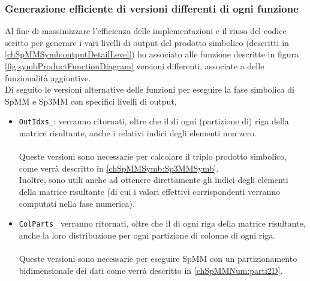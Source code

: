 \subsubsection{Generazione efficiente di versioni differenti di ogni funzione}
%
Al fine di massimizzare l'efficienza delle implementazioni e il riuso del codice scritto 
per generare i vari livelli di output del prodotto simbolico (descritti in \ref{chSpMMSymb:outputDetailLevel})
ho associato alle funzione descritte in figura \ref{fig:symbProductFunctionDiagram} 
versioni differenti, associate a delle funzionalità aggiuntive.\\
\label{chSpMMSymb:outputDetailLevel_coreFuncsVersions}
Di seguito le versioni alternative delle funzioni per eseguire la fase simbolica di SpMM e Sp3MM con specifici livelli di output,
\begin{itemize}
	\item	\verb|OutIdxs_|:
	verranno ritornati, oltre che il \nnnz di ogni (partizione di) riga della matrice risultante,
	anche i relativi indici degli elementi non zero. %
	\\ \\
	Queste versioni sono necessarie per calcolare il triplo prodotto simbolico,
	come verrà descritto in \ref{chSpMMSymb:Sp3MMSymb}.\\
	Inoltre, sono utili anche ad ottenere direttamente gli indici 
	degli elementi \nnz della matrice risultante (di cui i valori effettivi corrispondenti verranno computati nella fase numerica).\\

	\item	\verb|ColParts_|
	verranno ritornati, oltre che il \nnnz di ogni riga della matrice risultante,
	anche la loro distribuzione per ogni partizione di colonne di ogni riga. %
	\\ \\ 
	Queste versioni sono necessarie per eseguire SpMM con un partizionamento bidimensionale dei dati
	come verrà descritto in \ref{chSpMMNum:parti2D}.\\

\end{itemize}

